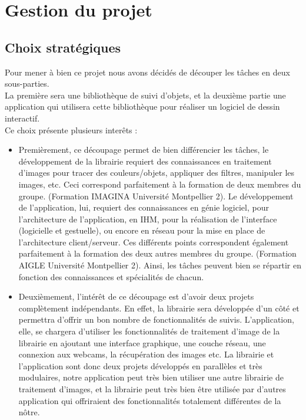 \documentclass{report}
\begin{document}
		\section{Gestion du projet}
			\subsection{Choix stratégiques}
			Pour mener à bien ce projet nous avons décidés de découper les tâches en deux sous-parties. \\
			La première sera une bibliothèque de suivi d'objets, et la deuxième partie une application qui utilisera
			cette bibliothèque pour réaliser un logiciel de dessin interactif. \\
			Ce choix présente plusieurs interêts : \\
			\begin{itemize}
				\item{Premièrement, ce découpage permet de bien différencier les tâches, le développement de la librairie requiert des connaissances en traitement d'images pour tracer des couleurs/objets, appliquer des filtres, manipuler les images, etc. Ceci correspond parfaitement à la formation de deux membres du groupe. (Formation IMAGINA Université Montpellier 2). 
				Le développement de l'application, lui, requiert des connaissances en génie logiciel, pour l'architecture de l'application, en IHM, pour la réalisation de l'interface (logicielle et gestuelle), ou encore en réseau pour la mise en place de l'architecture client/serveur. 
				Ces différents points correspondent également parfaitement à la formation des deux autres membres du groupe. (Formation AIGLE Université Montpellier 2). Ainsi, les tâches peuvent bien se répartir en fonction des connaissances et spécialités de chacun.} \\
				\item{Deuxièmement, l'intérêt de ce découpage est d'avoir deux projets complètement indépendants. En effet, la librairie sera développée d'un côté et permettra d'offrir un bon nombre de fonctionnalités de suivis. 
				L'application, elle, se chargera d'utiliser les fonctionnalités de traitement d'image de la librairie en ajoutant une interface graphique, une couche réseau, une connexion aux webcams, la récupération des images etc.
				La librairie et l'application sont donc deux projets développés en parallèles et très modulaires, notre application peut très bien utiliser une autre librairie de traitement d'images, et la librairie peut très bien être utilisée par d'autres application qui offriraient des fonctionnalités totalement différentes de la nôtre.}
			\end{itemize}
			\newpage
\end{document}
